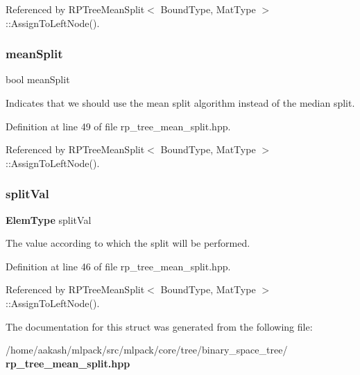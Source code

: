 Referenced by R\+P\+Tree\+Mean\+Split$<$ Bound\+Type, Mat\+Type $>$\+::\+Assign\+To\+Left\+Node().

\mbox{\label{structmlpack_1_1tree_1_1RPTreeMeanSplit_1_1SplitInfo_a66c386fb84a207f57aace1b0b527780d}} 
\subsubsection{mean\+Split}
{\footnotesize\ttfamily bool mean\+Split}



Indicates that we should use the mean split algorithm instead of the median split. 



Definition at line 49 of file rp\+\_\+tree\+\_\+mean\+\_\+split.\+hpp.



Referenced by R\+P\+Tree\+Mean\+Split$<$ Bound\+Type, Mat\+Type $>$\+::\+Assign\+To\+Left\+Node().

\mbox{\label{structmlpack_1_1tree_1_1RPTreeMeanSplit_1_1SplitInfo_a0940adf91ff7f1747d68384a012683d3}} 
\subsubsection{split\+Val}
{\footnotesize\ttfamily \textbf{ Elem\+Type} split\+Val}



The value according to which the split will be performed. 



Definition at line 46 of file rp\+\_\+tree\+\_\+mean\+\_\+split.\+hpp.



Referenced by R\+P\+Tree\+Mean\+Split$<$ Bound\+Type, Mat\+Type $>$\+::\+Assign\+To\+Left\+Node().



The documentation for this struct was generated from the following file\+:\begin{DoxyCompactItemize}
\item 
/home/aakash/mlpack/src/mlpack/core/tree/binary\+\_\+space\+\_\+tree/\textbf{ rp\+\_\+tree\+\_\+mean\+\_\+split.\+hpp}\end{DoxyCompactItemize}
